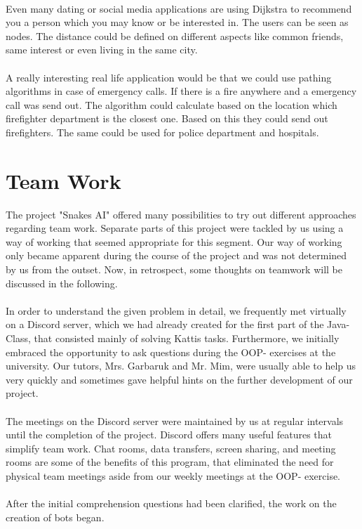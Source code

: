 \documentclass[a4paper,12pt]{article}
\begin{document}
\\Even many dating or social media applications are using Dijkstra to recommend you a person which you may know or be interested in. The users can be seen as nodes. The distance could be defined on different aspects like common friends, same interest or even living in the same city.\\
\\A really interesting real life application would be that we could use pathing algorithms in case of emergency calls. If there is a fire anywhere and a emergency call was send out. The algorithm could calculate based on the location which firefighter department is the closest one. Based on this they could send out firefighters. The same could be used for police department and hospitals.

\section{Team Work}
The project "Snakes AI" offered many possibilities to try out different approaches regarding team
work. Separate parts of this project were tackled by us using a way of working that seemed
appropriate for this segment. Our way of working only became apparent during the course of the
project and was not determined by us from the outset. Now, in retrospect, some thoughts on
teamwork will be discussed in the following.\\
\\In order to understand the given problem in detail, we frequently met virtually on a Discord server,
which we had already created for the first part of the Java-Class, that consisted mainly of solving
Kattis tasks. Furthermore, we initially embraced the opportunity to ask questions during the OOP-
exercises at the university. Our tutors, Mrs. Garbaruk and Mr. Mim, were usually able to help us
very quickly and sometimes gave helpful hints on the further development of our project.\\
\\The meetings on the Discord server were maintained by us at regular intervals until the completion
of the project. Discord offers many useful features that simplify team work. Chat rooms, data
transfers, screen sharing, and meeting rooms are some of the benefits of this program, that
eliminated the need for physical team meetings aside from our weekly meetings at the OOP-
exercise.\\
\\After the initial comprehension questions had been clarified, the work on the creation of bots began.
\end{document}
